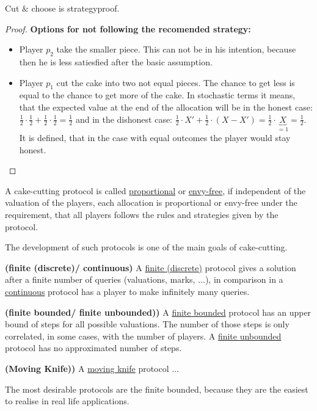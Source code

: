 \begin{satz}
Cut $\&$ choose is strategyproof.
\end{satz}
\begin{proof}
\textbf{Options for not following the recomended strategy:}
\begin{itemize}
\item Player $p_2$ take the smaller piece. This can not be in his intention, because then he is less satiesfied after the basic assumption.
\item Player $p_1$ cut the cake into two not equal pieces. The chance to get less is equal to the chance to get more of the cake. In stochastic terms it means, that the expected value at the end of the allocation will be in the honest case: $ \frac{1}{2} \cdot \frac{1}{2}+\frac{1}{2} \cdot \frac{1}{2}=\frac{1}{2} $ and in the dishonest case: $ \frac{1}{2} \cdot X' +\frac{1}{2} \cdot (X-X') =\frac{1}{2} \cdot \underbrace{X}_{=1}=\frac{1}{2}$. It is defined, that in the case with equal outcomes the player would stay honest.
\end{itemize}
\end{proof}

\begin{defi}
A cake-cutting protocol is called \underline{proportional} or \underline{envy-free}, if independent of the valuation of the players, each allocation is proportional or envy-free under the requirement, that all players follows the rules and strategies given by the protocol.
\end{defi}
The development of such protocols is one of the main goals of cake-cutting.

\begin{defi}{\textbf{(finite (discrete)/ continuous)}}
\newline A \underline{finite (discrete)} protocol gives a solution after a finite number of queries (valuations, marks, $\ldots$), in comparison in a \underline{continuous} protocol has a player to make infinitely many queries.
\end{defi}
\begin{defi}{\textbf{(finite bounded/ finite unbounded))}}
\newline A \underline{finite bounded} protocol has an upper bound of steps for all possible valuations. The number of those steps is only correlated, in some cases, with the number of players. A \underline{finite unbounded} protocol has no approximated number of steps.
\end{defi}
\begin{defi}{\textbf{(Moving Knife))}}
\newline A \underline{moving knife} protocol ...
\end{defi}
The most desirable protocols are the finite bounded, because they are the easiest to realise in real life applications. 
\pagebreak

